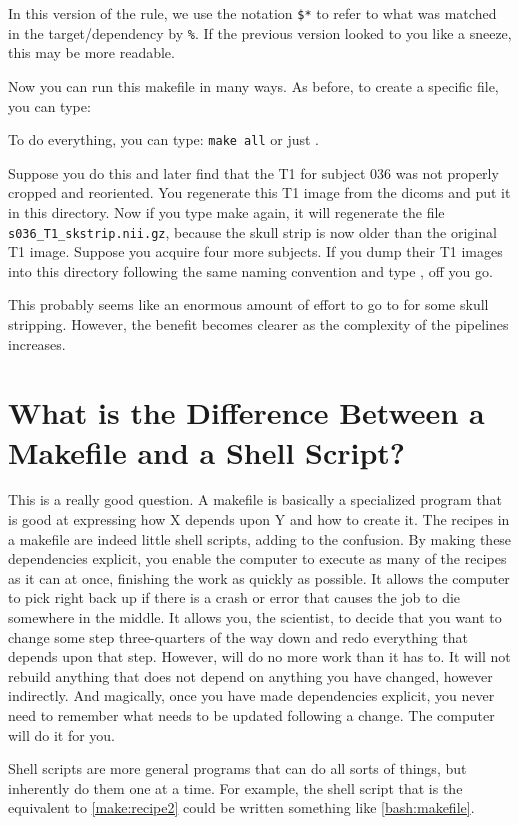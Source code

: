 In this version of the rule, we use the notation \texttt{\$*} to refer to what was matched in the target/dependency by \texttt{\%}. If the previous version looked to you like a sneeze, this may be more readable.
	
Now you can run this makefile in many ways. As before, to create a specific file, you can type:	
	
To do everything, you can type: \texttt{make all} or just \maken{}.
	
Suppose you do this and later find that the T1 for subject 036 was not properly cropped and reoriented. You regenerate this T1 image from the dicoms and put it in this directory. Now if you type make again, it will regenerate the file \texttt{s036_T1_skstrip.nii.gz}, because the skull strip is now older than the original T1 image. Suppose you acquire four more subjects. If you dump their T1 images into this directory following the same naming convention and type \maken{}, off you go.

This probably seems like an enormous amount of effort to go to for some skull stripping. However, the benefit becomes clearer as the complexity of the pipelines increases.
	
\section{What is the Difference Between a Makefile and a Shell Script?}
	
This is a really good question. A makefile is basically a specialized program that is good at expressing how X depends upon Y and how to create it. The recipes in a makefile are indeed little shell scripts, adding to the confusion. By making these dependencies explicit, you enable the computer to execute as many of the recipes as it can at once, finishing the work as quickly as possible. It allows the computer to pick right back up if there is a crash or error that  causes the job to die somewhere in the middle. It allows you, the scientist, to decide that you want to change some step three-quarters of the way down and redo everything that depends upon that step. However, \maken{} will do no more work than it has to. It will not rebuild anything that does not depend on anything you have changed, however indirectly. And magically, once you have made dependencies explicit, you never need to remember what needs to be updated following a change. The computer will do it for you. 
	
Shell scripts are more general programs that can do all sorts of things, but inherently do them one at a time. For example, the shell script that is the equivalent to \autoref{make:recipe2} could be written something like \autoref{bash:makefile}.
	

